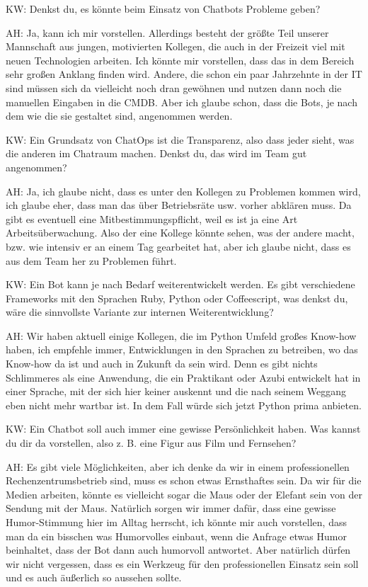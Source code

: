 \begin{list}{X:}{\setlength{\labelsep}{5mm}}
\item [KW:] Denkst du, es könnte beim Einsatz von Chatbots Probleme geben?
\item [AH:] Ja, kann ich mir vorstellen. Allerdings besteht der größte Teil unserer Mannschaft aus jungen, motivierten Kollegen, die auch in der Freizeit viel mit neuen Technologien arbeiten. Ich könnte mir vorstellen, dass das in dem Bereich sehr großen Anklang finden wird. Andere, die schon ein paar Jahrzehnte in der IT sind müssen sich da vielleicht noch dran gewöhnen und nutzen dann noch die manuellen Eingaben in die CMDB. Aber ich glaube schon, dass die Bots, je nach dem wie die sie gestaltet sind, angenommen werden.
\item [KW:] Ein Grundsatz von ChatOps ist die Transparenz, also dass jeder sieht, was die anderen im Chatraum machen. Denkst du, das wird im Team gut angenommen?
\item [AH:] Ja, ich glaube nicht, dass es unter den Kollegen zu Problemen kommen wird, ich glaube eher, dass man das über Betriebsräte usw. vorher abklären muss. Da gibt es eventuell eine Mitbestimmungspflicht, weil es ist ja eine Art Arbeitsüberwachung. Also der eine Kollege könnte sehen, was der andere macht, bzw. wie intensiv er an einem Tag gearbeitet hat, aber ich glaube nicht, dass es aus dem Team her zu Problemen führt.
\item [KW:] Ein Bot kann je nach Bedarf weiterentwickelt werden. Es gibt verschiedene Frameworks mit den Sprachen Ruby, Python oder Coffeescript, was denkst du, wäre die sinnvollste Variante zur internen Weiterentwicklung?
\item [AH:] Wir haben aktuell einige Kollegen, die im Python Umfeld großes Know-how haben, ich empfehle immer, Entwicklungen in den Sprachen zu betreiben, wo das Know-how da ist und auch in Zukunft da sein wird. Denn es gibt nichts Schlimmeres als eine Anwendung, die ein Praktikant oder Azubi entwickelt hat in einer Sprache, mit der sich hier keiner auskennt und die nach seinem Weggang eben nicht mehr wartbar ist. In dem Fall würde sich jetzt Python prima anbieten.
\item [KW:] Ein Chatbot soll auch immer eine gewisse Persönlichkeit haben. Was kannst du dir da vorstellen, also z. B. eine Figur aus Film und Fernsehen?
\item [AH:] Es gibt viele Möglichkeiten, aber ich denke da wir in einem professionellen Rechenzentrumsbetrieb sind, muss es schon etwas Ernsthaftes sein. Da wir für die Medien arbeiten, könnte es vielleicht sogar die Maus oder der Elefant sein von der Sendung mit der Maus. Natürlich sorgen wir immer dafür, dass eine gewisse Humor-Stimmung hier im Alltag herrscht, ich könnte mir auch vorstellen, dass man da ein bisschen was Humorvolles einbaut, wenn die Anfrage etwas Humor beinhaltet, dass der Bot dann auch humorvoll antwortet. Aber natürlich dürfen wir nicht vergessen, dass es ein Werkzeug für den professionellen Einsatz sein soll und es auch äußerlich so aussehen sollte.

\end{list}
